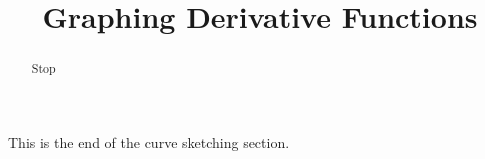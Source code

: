 \documentclass[handout]{ximera}
\title{Graphing Derivative Functions}
\begin{document}
\begin{abstract} Stop
\end{abstract}

\maketitle

This is the end of the curve sketching section.
\end{document}
